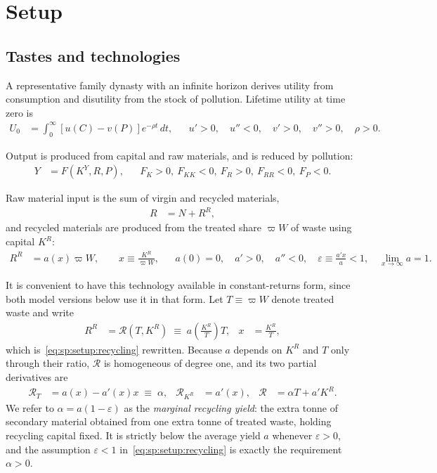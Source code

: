 ﻿\section{Setup}\label{sec:sp:setup}


\subsection{Tastes and technologies}
\label{sec:sp:setup:primitives}


 A representative family dynasty with an infinite horizon derives utility from consumption and disutility from the stock of pollution. Lifetime utility at time zero is
\begin{align}
U_0 &= \int_0^{\infty}\left[u(C)-v(P)\right]e^{-\rho t}\,dt,
&&
u'>0,\quad u''<0,\quad v'>0,\quad v''>0,\quad \rho>0.
\label{eq:sp:setup:utility}
\end{align}

 Output is produced from capital and raw materials, and is reduced by pollution:
\begin{align}
Y &= F\left(K^Y,R,P\right),
&&
F_K>0,\ F_{KK}<0,\ F_R>0,\ F_{RR}<0,\ F_P<0.
\label{eq:sp:setup:output}
\end{align}

 Raw material input is the sum of virgin and recycled materials,
\begin{align}
R &= N + R^R,
\label{eq:sp:setup:materials}
\end{align}
and recycled materials are produced from the treated share $\varpi W$ of waste using capital $K^R$:
\begin{align}
R^R &= a\!\left(x\right)\varpi W,
\qquad
x\equiv\frac{K^R}{\varpi W},
&&
a(0)=0,\quad a'>0,\quad a''<0,\quad
\varepsilon\equiv \frac{a'x}{a}<1,\quad
\lim_{x\to\infty}a=1.
\label{eq:sp:setup:recycling}
\end{align}

It is convenient to have this technology available in constant-returns form, since both model
versions below use it in that form. Let $T\equiv\varpi W$ denote treated waste and write
\begin{align}
R^R &= \mathcal R\left(T,K^R\right)\;\equiv\;a\!\left(\frac{K^R}{T}\right)T,
&
x&=\frac{K^R}{T},
\label{eq:sp:setup:recycling-crs}
\end{align}
which is~\eqref{eq:sp:setup:recycling} rewritten. Because $a$ depends on $K^R$ and $T$ only through
their ratio, $\mathcal R$ is homogeneous of degree one, and its two partial derivatives are
\begin{align}
\mathcal R_T &= a\left(x\right)-a'\!\left(x\right)x \;\equiv\;\alpha,
&
\mathcal R_{K^R} &= a'\!\left(x\right),
&
\mathcal R &= \alpha T+a'K^R .
\label{eq:sp:setup:recycling-derivatives}
\end{align}
We refer to $\alpha=a\left(1-\varepsilon\right)$ as the \emph{marginal recycling yield}: the extra
tonne of secondary material obtained from one extra tonne of treated waste, holding recycling
capital fixed. It is strictly below the average yield $a$ whenever $\varepsilon>0$, and the
assumption $\varepsilon<1$ in~\eqref{eq:sp:setup:recycling} is exactly the requirement $\alpha>0$.

